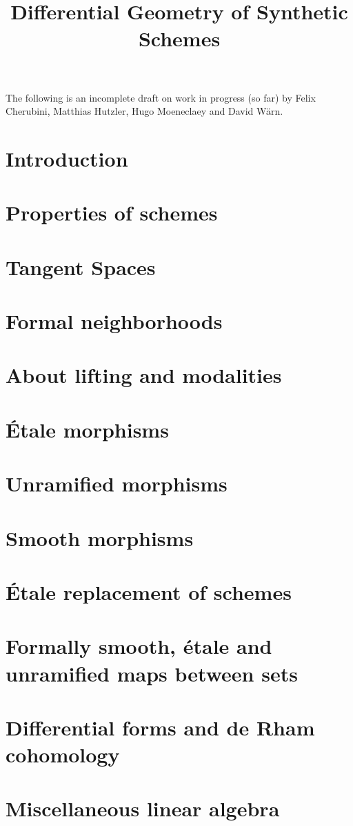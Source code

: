 \documentclass{../util/zariski}
\title{Differential Geometry of Synthetic Schemes}
\begin{document}
\maketitle

The following is an incomplete draft on work in progress (so far)
by Felix Cherubini, Matthias Hutzler, Hugo Moeneclaey and David Wärn.

\tableofcontents

\section*{Introduction}


\section{Properties of schemes}


\section{Tangent Spaces}



\section{Formal neighborhoods}


\section{About lifting and modalities}


\section{Étale morphisms}


\section{Unramified morphisms}


\section{Smooth morphisms}


\section{Étale replacement of schemes}


\section{Formally smooth, étale and unramified maps between sets}


\section{Differential forms and de Rham cohomology}


\section{Miscellaneous linear algebra}


\printindex

\printbibliography
\end{document}
